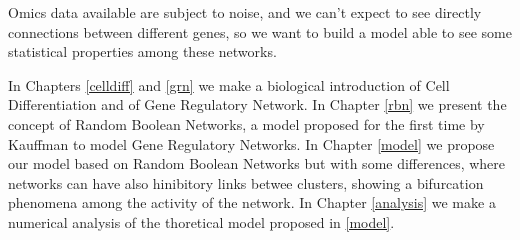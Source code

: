 Omics data available are subject to noise, and we can’t expect to see directly connections between different genes, so we want to build a model able to see some statistical properties among these networks.

In Chapters \ref{celldiff} and \ref{grn} we make a biological introduction of Cell Differentiation and of Gene Regulatory Network.
In Chapter \ref{rbn} we present the concept of Random Boolean Networks, a model proposed for the first time by Kauffman to model Gene Regulatory Networks.
In Chapter \ref{model} we propose our model based on Random Boolean Networks but with some differences, where networks can have also hinibitory links betwee clusters, showing a bifurcation phenomena among the activity of the network.
In Chapter \ref{analysis} we make a numerical analysis of the thoretical model proposed in \ref{model}.

